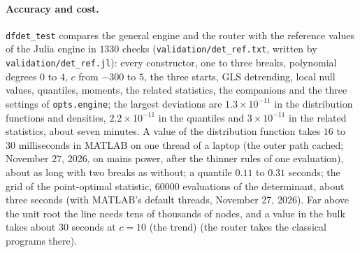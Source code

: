 \documentclass[11pt]{article}
\newcommand{\code}[1]{\texttt{#1}}
\begin{document}
\paragraph{Accuracy and cost.}  \code{dfdet\_test} compares the general engine and the router with the reference values of the Julia engine in $1330$ checks (\code{validation/det\_ref.txt}, written by \code{validation/det\_ref.jl}): every constructor, one to three breaks, polynomial degrees $0$ to $4$, $c$ from $-300$ to $5$, the three starts, GLS detrending, local null values, quantiles, moments, the related statistics, the companions and the three settings of \code{opts.engine}; the largest deviations are $1.3\times10^{-11}$ in the distribution functions and densities, $2.2\times10^{-11}$ in the quantiles and $3\times10^{-11}$ in the related statistics, about seven minutes.  A value of the distribution function takes $16$ to $30$ milliseconds in MATLAB on one thread of a laptop (the outer path cached; November 27, 2026, on mains power, after the thinner rules of one evaluation), about as long with two breaks as without; a quantile $0.11$ to $0.31$ seconds; the grid of the point-optimal statistic, $60000$ evaluations of the determinant, about three seconds (with MATLAB's default threads, November 27, 2026).  Far above the unit root the line needs tens of thousands of nodes, and a value in the bulk takes about $30$ seconds at $c=10$ (the trend) (the router takes the classical programs there).
\end{document}
